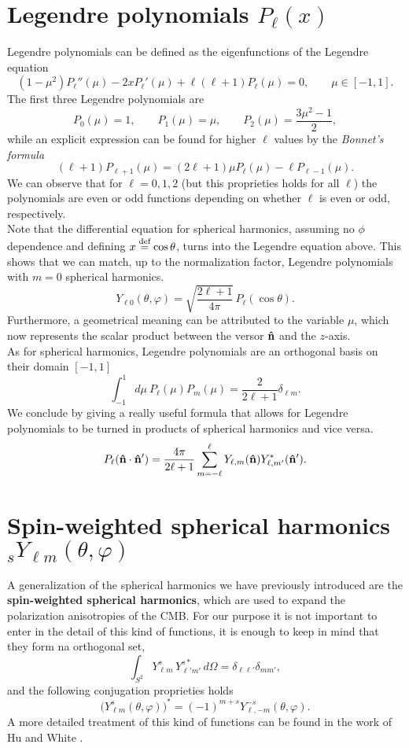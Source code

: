 \section{Legendre polynomials \(P_\ell(x)\)}
\label{app:legendre}
Legendre polynomials can be defined as the eigenfunctions of the Legendre equation 
\[
(1-\mu^2)P_\ell''(\mu)-2xP_\ell'(\mu)+\ell(\ell+1)P_\ell(\mu)=0,\qquad \mu\in[-1,1].
\]
The first three Legendre polynomials are 
$$
P_0(\mu)=1,\qquad P_1(\mu)=\mu,\qquad P_2(\mu)=\frac{3\mu^2-1}{2},
$$
while an explicit expression can be found for higher $\ell$ values by the \emph{Bonnet's formula}
\[
(\ell+1)P_{\ell+1}(\mu)=(2\ell+1)\mu P_\ell(\mu)-\ell P_{\ell-1}(\mu).
\]
We can observe that for $\ell=0,1,2$ (but this proprieties holds for all $\ell$) the polynomials are even or odd functions depending on whether $\ell$ is even or odd, respectively.\\
Note that the differential equation for spherical harmonics, assuming no $\phi$ dependence and defining $x\stackrel{\text{def}}{=}\cos\theta$, turns into the Legendre equation above. This shows that we can match, up to the normalization factor, Legendre polynomials with $m=0$ spherical harmonics.
\[
Y_{\ell 0}(\theta,\varphi)=\sqrt{\frac{2\ell+1}{4\pi}}\,P_\ell(\cos\theta).
\]
Furthermore, a geometrical meaning can be attributed to the variable $\mu$, which now represents the scalar product between the versor $\mathbf{\hat{n}}$ and the $z$-axis.\\
As for spherical harmonics, Legendre polynomials are an orthogonal basis on their domain $[-1,1]$
\[
\int_{-1}^{1}d\mu\ P_\ell(\mu)P_{m}(\mu)=\frac{2}{2\ell+1}\delta_{\ell m}.
\]
We conclude by giving a really useful formula that allows for Legendre polynomials to be turned in products of spherical harmonics and vice versa.
$$
P_\ell(\mathbf{\hat{n}}\cdot\mathbf{\hat{n}}')=\frac{4\pi}{2\ell+1}\sum_{m=-\ell}^\ell Y_{\ell,m}(\mathbf{\hat{n}})Y^*_{\ell,m'}(\mathbf{\hat{n}}').$$



\section{Spin-weighted spherical harmonics \({}_sY_{\ell m}(\theta,\varphi)\)}
\label{app:spin-weighted}
A generalization of the spherical harmonics we have previously introduced are the \textbf{spin-weighted spherical harmonics}, which are used to expand the polarization anisotropies of the CMB. 
For our purpose it is not important to enter in the detail of this kind of functions, it is enough to keep in mind that they form na orthogonal set,
\[
\int_{S^2} Y^s_{\ell m}\,Y^{s*}_{\ell' m'}\,d\Omega=\delta_{\ell\ell'}\delta_{mm'},
\]
and the following conjugation proprieties holds
\[
\big(Y^s_{\ell m}(\theta,\varphi)\big)^*=(-1)^{m+s}Y^{-s}_{\ell,-m}(\theta,\varphi).
\]
A more detailed treatment of this kind of functions can be found in the work of Hu and White \cite{HuWhite}. 


